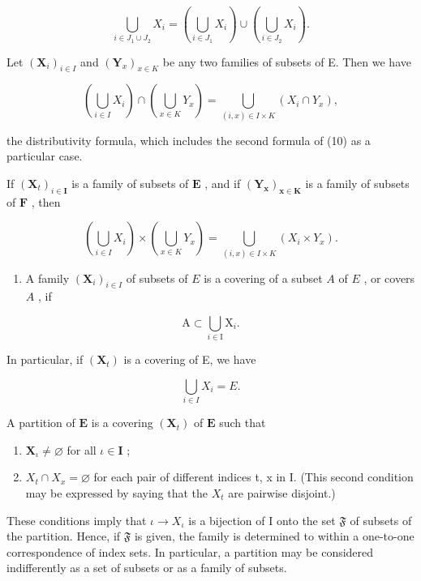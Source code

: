 \[
\bigcup_ {i \in J _ {1} \cup J _ {2}} X _ {i} = \left(\bigcup_ {i \in J _ {1}} X _ {i}\right) \cup \left(\bigcup_ {i \in J _ {2}} X _ {i}\right).\tag{36}
\]

Let \((\mathbf{X}_i)_{i\in I}\) and \((\mathbf{Y}_x)_{x\in K}\) be any two families of subsets of E. Then we have

\[
\left(\bigcup_ {i \in I} X _ {i}\right) \cap \left(\bigcup_ {x \in K} Y _ {x}\right) = \bigcup_ {(i, x) \in I \times K} (X _ {i} \cap Y _ {x}),\tag{37}
\]

the distributivity formula, which includes the second formula of (10) as a particular case.

If \((\mathbf{X}_t)_{i\in \mathbf{I}}\) is a family of subsets of \(\mathbf{E}\) , and if \((\mathbf{Y}_{\mathbf{x}})_{\mathbf{x}\in \mathbf{K}}\) is a family of subsets of \(\mathbf{F}\) , then

\[
\left(\bigcup_ {i \in I} X _ {i}\right) \times \left(\bigcup_ {x \in K} Y _ {x}\right) = \bigcup_ {(i, x) \in I \times K} (X _ {i} \times Y _ {x}).\tag{38}
\]

\begin{enumerate}
\def\labelenumi{\arabic{enumi}.}
\setcounter{enumi}{3}
\tightlist
\item
  A family \((\mathbf{X}_i)_{i\in I}\) of subsets of \(E\) is a covering of a subset \(A\) of \(E\) , or covers \(A\) , if
\end{enumerate}

\[
\mathrm{A} \subset \bigcup_ {i \in \mathrm{I}} \mathrm{X} _ {i}.
\]

In particular, if \((\mathbf{X}_{t})\) is a covering of E, we have

\[
\bigcup_ {i \in I} X _ {i} = E.
\]

A partition of \(\mathbf{E}\) is a covering \((\mathbf{X}_t)\) of \(\mathbf{E}\) such that

\begin{enumerate}
\def\labelenumi{(\alph{enumi})}
\item
  \(\mathbf{X}_{\iota} \neq \varnothing\) for all \(\iota \in \mathbf{I}\) ;
\item
  \(X_{t} \cap X_{x} = \varnothing\) for each pair of different indices t, x in I. (This second condition may be expressed by saying that the \(X_{t}\) are pairwise disjoint.)
\end{enumerate}

These conditions imply that \(\iota \to X_{\iota}\) is a bijection of I onto the set \(\mathfrak{F}\) of subsets of the partition. Hence, if \(\mathfrak{F}\) is given, the family is determined to within a one-to-one correspondence of index sets. In particular, a partition may be considered indifferently as a set of subsets or as a family of subsets.

